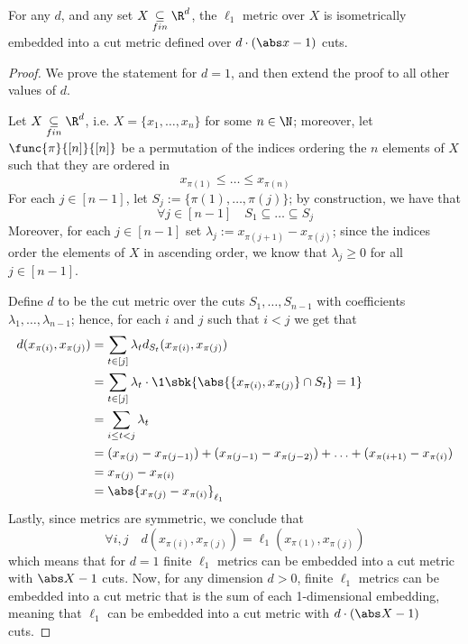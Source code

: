 \documentclass[a4paper, 12pt]{report}
\begin{document}
    \begin{framedlem}[label={metric lemma}]{}
        For any $d$, and any set $X \underset{fin}{\subseteq} \R^d$, the $\ell_1$ metric over $X$ is isometrically embedded into a cut metric defined over $d \cdot(\abs x - 1)$ cuts.
    \end{framedlem}

    \begin{proof}
        We prove the statement for $d =1$, and then extend the proof to all other values of $d$.

        Let $X \underset{fin}{\subseteq} \R^d$, i.e. $X = \{x_1, \ldots, x_n\}$ for some $n \in \N$; moreover, let $\func{\pi}{[n]}{[n]}$ be a permutation of the indices ordering the $n$ elements of $X$ such that they are ordered in  $$x_{\pi(1)} \le \ldots \le x_{\pi(n)}$$ For each $j \in [n - 1]$, let $S_j := \{\pi(1), \ldots, \pi(j)\}$; by construction, we have that $$\forall j \in [n - 1] \quad S_1 \subseteq \ldots \subseteq S_j$$ Moreover, for each $j \in [n - 1]$ set $\lambda_j := x_{\pi(j + 1)} - x_{\pi(j)}$; since the indices order the elements of $X$ in ascending order, we know that $\lambda_j \ge 0$ for all $j \in [n - 1]$.

        Define $d$ to be the cut metric over the cuts $S_1, \ldots, S_{n - 1}$ with coefficients $\lambda_1, \ldots, \lambda_{n - 1}$; hence, for each $i$ and $j$ such that $i < j$ we get that
        \begin{equation*}
            \begin{split}
                d(x_{\pi(i)}, x_{\pi(j)}) &= \sum_{t \in [j]}{\lambda_t d_{S_t}(x_{\pi(i)}, x_{\pi(j)})} \\
                                          &= \sum_{t \in [j]}{\lambda_t \cdot \1 \sbk{\abs{\{x_{\pi(i)}, x_{\pi(j)}\} \cap S_t} = 1}} \\
                                          &= \sum_{i \le t < j}{\lambda_t} \\
                                          &= (x_{\pi(j)} - x_{\pi(j - 1)}) + (x_{\pi(j - 1)} - x_{\pi(j - 2)}) + \ldots + (x_{\pi(i + 1)} - x_{\pi(i)}) \\
                                          &= x_{\pi(j)} - x_{\pi(i)} \\
                                          &= \abs{x_{\pi(j)} - x_{\pi(i)}}_{\ell_1}
            \end{split}
        \end{equation*}
        Lastly, since metrics are symmetric, we conclude that $$\forall i,j \quad d(x_{\pi(i)}, x_{\pi(j)}) = \ell_1(x_{\pi(1)}, x_{\pi(j)})$$ which means that for $d=1$ finite $\ell_1$ metrics can be embedded into a cut metric with $\abs X - 1$ cuts. Now, for any dimension $d > 0$, finite $\ell_1$ metrics can be embedded into a cut metric that is the sum of each 1-dimensional embedding, meaning that $\ell_1$ can be embedded into a cut metric with $d \cdot(\abs X - 1)$ cuts.
    \end{proof}
\end{document}
